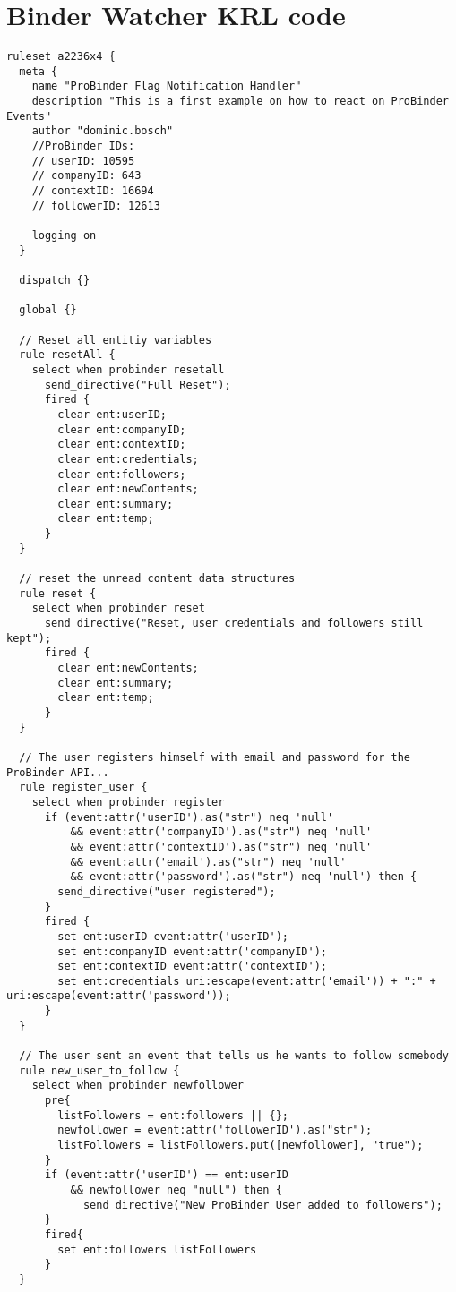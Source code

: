 \documentclass[11pt]{article}%
\begin{document}
\section{Binder Watcher KRL code} \label{app:uc_bw_krl}
\begin{lstlisting}[breaklines]
ruleset a2236x4 {
  meta {
  	name "ProBinder Flag Notification Handler"
  	description "This is a first example on how to react on ProBinder Events"
  	author "dominic.bosch"
    //ProBinder IDs:
    // userID: 10595
    // companyID: 643
    // contextID: 16694
    // followerID: 12613
    
  	logging on
  }
  
  dispatch {}
  
  global {}
  
  // Reset all entitiy variables
  rule resetAll {
    select when probinder resetall
      send_directive("Full Reset");
      fired {
        clear ent:userID;
        clear ent:companyID;
        clear ent:contextID;
        clear ent:credentials;
        clear ent:followers;
        clear ent:newContents;
        clear ent:summary;
        clear ent:temp;
      }
  }
  
  // reset the unread content data structures
  rule reset {
    select when probinder reset
      send_directive("Reset, user credentials and followers still kept");
      fired {
        clear ent:newContents;
        clear ent:summary;
        clear ent:temp;
      }
  }
  
  // The user registers himself with email and password for the ProBinder API...
  rule register_user {
    select when probinder register
      if (event:attr('userID').as("str") neq 'null'
          && event:attr('companyID').as("str") neq 'null'
          && event:attr('contextID').as("str") neq 'null'
          && event:attr('email').as("str") neq 'null'
          && event:attr('password').as("str") neq 'null') then {
        send_directive("user registered");
      }
      fired {
        set ent:userID event:attr('userID');
        set ent:companyID event:attr('companyID');
        set ent:contextID event:attr('contextID');
        set ent:credentials uri:escape(event:attr('email')) + ":" + uri:escape(event:attr('password'));
      }
  }
  
  // The user sent an event that tells us he wants to follow somebody
  rule new_user_to_follow {
    select when probinder newfollower
      pre{
        listFollowers = ent:followers || {};
        newfollower = event:attr('followerID').as("str");
        listFollowers = listFollowers.put([newfollower], "true");
      }
      if (event:attr('userID') == ent:userID
          && newfollower neq "null") then {
            send_directive("New ProBinder User added to followers");
      }
      fired{
        set ent:followers listFollowers
      }
  }
  

\end{lstlisting}
\end{document}
